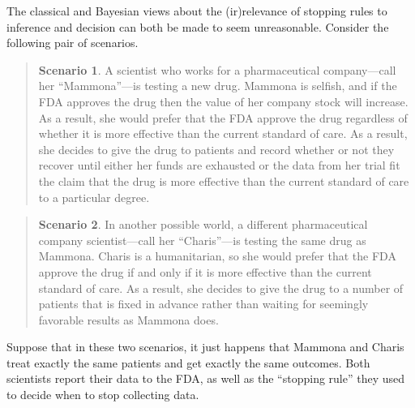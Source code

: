 \documentclass{article}
\theoremstyle{definition}
\newtheorem{scenario}{Scenario}
\begin{document}
The classical and Bayesian views about the (ir)relevance of stopping rules to inference and decision can both be made to seem unreasonable.
Consider the following pair of scenarios.
\vspace{-10 mm}
	\begin{quotation}
		\begin{scenario}
A scientist who works for a pharmaceutical company---call her ``Mammona''---is testing a new drug.
Mammona is selfish, and if the FDA approves the drug then the value of her company stock will increase.
As a result, she would prefer that the FDA approve the drug regardless of whether it is more effective than the current standard of care.
As a result, she decides to give the drug to patients and record whether or not they recover until either her funds are exhausted or the data from her trial fit the claim that the drug is more effective than the current standard of care to a particular degree.
		\end{scenario}
	\end{quotation}

\vspace{-10 mm}
	\begin{quotation}
		\begin{scenario}
In another possible world, a different pharmaceutical company scientist---call her ``Charis''---is testing the same drug as Mammona.
Charis is a humanitarian, so she would prefer that the FDA approve the drug if and only if it is more effective than the current standard of care.
As a result, she decides to give the drug to a number of patients that is fixed in advance rather than waiting for seemingly favorable results as Mammona does.
\end{scenario}
		\end{quotation}

Suppose that in these two scenarios, it just happens that Mammona and Charis treat exactly the same patients and get exactly the same outcomes.
Both scientists report their data to the FDA, as well as the ``stopping rule'' they used to decide when to stop collecting data.
\end{document}
